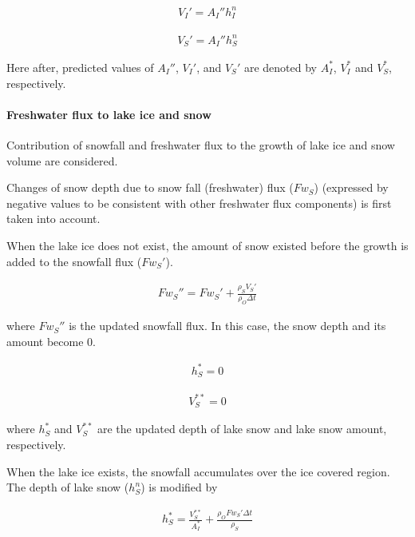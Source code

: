\begin{eqnarray}
    V_I' = A_I'' h_I^n
\end{eqnarray}

\begin{eqnarray}
    V_S' = A_I'' h_S^n
\end{eqnarray}

Here after, predicted values of \(A_I''\), \(V_I'\), and \(V_S'\) are denoted by \(A_I^\ast\), \(V_I^\ast\) and \(V_S^{\ast}\), respectively.

\paragraph{Freshwater flux to lake ice and snow}\label{freshwater-flux-to-lake-ice-and-snow}

Contribution of snowfall and freshwater flux to the growth of lake ice and snow volume are considered.

Changes of snow depth due to snow fall (freshwater) flux (\(Fw_S\)) (expressed by negative values to be consistent with other freshwater flux components) is first taken into account.

When the lake ice does not exist, the amount of snow existed before the growth is added to the snowfall flux (\(Fw_S'\)).

\begin{eqnarray}
    Fw_S'' = Fw_S' + \frac{\rho_S V_S'}{\rho_O \Delta t}
\end{eqnarray}

where \(Fw_S''\) is the updated snowfall flux. In this case, the snow depth and its amount become 0.

\begin{eqnarray}
h_S^\ast=0
\end{eqnarray}

\begin{eqnarray}
V_S^{\ast\ast} = 0
\end{eqnarray}

where \(h_S^\ast\) and \(V_S^{\ast\ast}\) are the updated depth of lake snow and lake snow amount, respectively.

When the lake ice exists, the snowfall accumulates over the ice covered region. The depth of lake snow (\(h_S^n\)) is modified by

\begin{eqnarray}
    h_S^\ast = \frac{V_S^{\ast\ast}}{A_I^\ast} + \frac{\rho_O Fw_S'\Delta t}{\rho_S}
\end{eqnarray}

